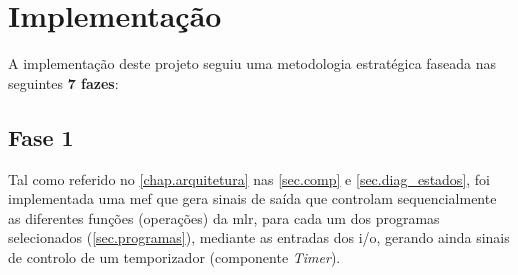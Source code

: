 \chapter{Implementação}	
\label{chap.implementação}

A implementação deste projeto seguiu uma metodologia estratégica faseada nas seguintes \textbf{7 fazes}:


\section{Fase 1}
\label{sec.fase1}

Tal como referido no \autoref{chap.arquitetura} nas \autoref{sec.comp} e \autoref{sec.diag_estados}, foi implementada uma \ac{mef} que gera sinais de saída que controlam sequencialmente as diferentes funções (operações) da \acf{mlr}, para cada um dos programas selecionados (\autoref{sec.programas}), mediante as entradas dos \ac{i/o}, gerando ainda sinais de controlo de um temporizador (componente \textit{Timer}). \\

